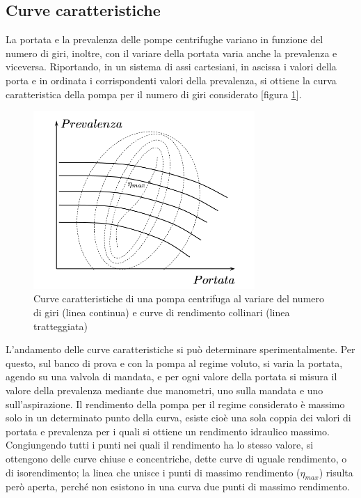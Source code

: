 \documentclass[laurea,oneside,11pt]{USiena_tesiLM}
\begin{document}
\subsection{Curve caratteristiche}
La portata e la prevalenza delle pompe centrifughe variano in funzione del numero di giri, inoltre, con il variare della portata varia anche la prevalenza e viceversa. Riportando, in un sistema di assi cartesiani, in ascissa i valori della porta e in ordinata i corrispondenti valori della prevalenza, si ottiene la curva caratteristica della pompa per il numero di giri considerato [figura \ref{fig:curve_car}].

\begin{figure}[!ht]
\centering
\includegraphics[width=0.75\textwidth]{figure/curve_car} 
\caption{Curve caratteristiche di una pompa centrifuga al variare del numero di giri (linea continua) e curve di rendimento collinari (linea tratteggiata)}
\label{fig:curve_car}
\end{figure}

L'andamento delle curve caratteristiche si può determinare sperimentalmente.
Per questo, sul banco di prova e con la pompa al regime voluto, si varia la portata, agendo
su una valvola di mandata, e per ogni valore della portata si misura il valore della
prevalenza mediante due manometri, uno sulla mandata e uno sull'aspirazione.
Il rendimento della pompa per il regime considerato è massimo solo in un determinato
punto della curva, esiste cioè una sola coppia dei valori di portata e prevalenza per i quali si ottiene
un rendimento idraulico massimo.
Congiungendo tutti i punti nei quali il rendimento ha lo stesso valore, si ottengono delle curve chiuse e concentriche, dette curve di uguale rendimento, o di isorendimento; la linea che unisce i punti di massimo rendimento ($\eta_{max}$) risulta però aperta, perché non esistono in una curva due punti di massimo rendimento.
\end{document}
